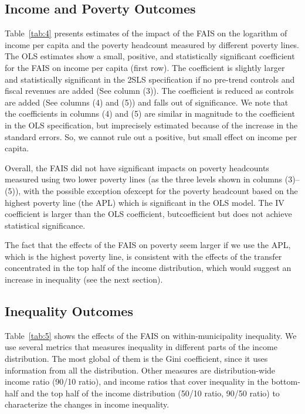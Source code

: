 \documentclass[dv_diss_main.tex]{subfiles}
\begin{document}
\subsection{Income and Poverty Outcomes}\label{subsec:income}

Table~\ref{tab:4} presents estimates of the impact of the FAIS on the logarithm of income per capita and the poverty headcount measured by different poverty lines. The OLS estimates show a small, positive, and statistically significant coefficient for the FAIS on income per capita (first row). The coefficient is slightly larger and statistically significant in the 2SLS specification if no pre-trend controls and fiscal revenues are added (See column (3)). The coefficient is reduced as controls are added (See columns (4) and (5)) and falls out of significance. We note that the coefficients in columns (4) and (5) are similar in magnitude to the coefficient in the OLS specification, but imprecisely estimated because of the increase in the standard errors. So, we cannot rule out a positive, but small effect on income per capita.

Overall, the FAIS did not have significant impacts on poverty headcounts measured using two lower poverty lines (as the three levels shown in columns (3)–(5)), with the possible exception ofexcept for the poverty headcount based on the highest poverty line (the APL) which is significant in the OLS model. The IV coefficient is larger than the OLS coefficient, butcoefficient but does not achieve statistical significance.

The fact that the effects of the FAIS on poverty seem larger if we use the APL, which is the highest poverty line, is consistent with the effects of the transfer concentrated in the top half of the income distribution, which would suggest an increase in inequality (see the next section).

\subsection{Inequality Outcomes}\label{subsec:inequiality}

Table~\ref{tab:5} shows the effects of the FAIS on within-municipality inequality. We use several metrics that measures inequality in different parts of the income distribution. The most global of them is the Gini coefficient, since it uses information from all the distribution. Other measures are distribution-wide income ratio (90/10 ratio), and income ratios that cover inequality in the bottom-half and the top half of the income distribution (50/10 ratio, 90/50 ratio) to characterize the changes in income inequality.
\end{document}
